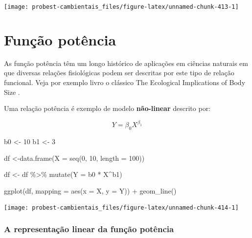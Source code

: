 \documentclass[
]{book}
\newenvironment{Shaded}{\begin{snugshade}}{\end{snugshade}}
\newcommand{\AttributeTok}[1]{\textcolor[rgb]{0.77,0.63,0.00}{#1}}
\newcommand{\DecValTok}[1]{\textcolor[rgb]{0.00,0.00,0.81}{#1}}
\newcommand{\FunctionTok}[1]{\textcolor[rgb]{0.00,0.00,0.00}{#1}}
\newcommand{\NormalTok}[1]{#1}
\newcommand{\OtherTok}[1]{\textcolor[rgb]{0.56,0.35,0.01}{#1}}
\newcommand{\SpecialCharTok}[1]{\textcolor[rgb]{0.00,0.00,0.00}{#1}}
\begin{document}
\begin{center}\texttt{[image: probest-cambientais\_files/figure-latex/unnamed-chunk-413-1]} \end{center}

\hypertarget{funuxe7uxe3o-potuxeancia}{%
\section{Função potência}\label{funuxe7uxe3o-potuxeancia}}

As função potência têm um longo histórico de aplicações em ciências naturais em que diversas relações fisiológicas podem ser descritas por este tipo de relação funcional. Veja por exemplo livro o clássico The Ecological Implications of Body Size \citep{peters1986ecological}.

Uma relação potência é exemplo de modelo \textbf{não-linear} descrito por:

\[Y = \beta_{0}X^{\beta_{1}}\]

\begin{Shaded}
\begin{Highlighting}[]
\NormalTok{b0 }\OtherTok{\textless{}{-}} \DecValTok{10}
\NormalTok{b1 }\OtherTok{\textless{}{-}} \DecValTok{3}

\NormalTok{df }\OtherTok{\textless{}{-}}\FunctionTok{data.frame}\NormalTok{(}\AttributeTok{X =} \FunctionTok{seq}\NormalTok{(}\DecValTok{0}\NormalTok{, }\DecValTok{10}\NormalTok{, }\AttributeTok{length =} \DecValTok{100}\NormalTok{))}

\NormalTok{df }\OtherTok{\textless{}{-}}\NormalTok{ df }\SpecialCharTok{\%\textgreater{}\%} \FunctionTok{mutate}\NormalTok{(}\AttributeTok{Y =}\NormalTok{ b0 }\SpecialCharTok{*}\NormalTok{ X}\SpecialCharTok{\^{}}\NormalTok{b1)}

\FunctionTok{ggplot}\NormalTok{(df, }\AttributeTok{mapping =} \FunctionTok{aes}\NormalTok{(}\AttributeTok{x =}\NormalTok{ X, }\AttributeTok{y =}\NormalTok{ Y)) }\SpecialCharTok{+}
  \FunctionTok{geom\_line}\NormalTok{()}
\end{Highlighting}
\end{Shaded}

\begin{center}\texttt{[image: probest-cambientais\_files/figure-latex/unnamed-chunk-414-1]} \end{center}

\hypertarget{a-representauxe7uxe3o-linear-da-funuxe7uxe3o-potuxeancia}{%
\subsubsection*{A representação linear da função potência}\label{a-representauxe7uxe3o-linear-da-funuxe7uxe3o-potuxeancia}}
\end{document}
